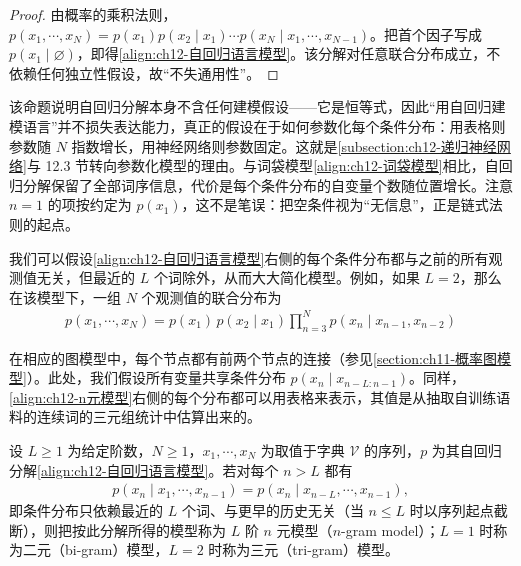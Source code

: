 \documentclass[../../main.tex]{subfiles}
\begin{document}
\begin{proof}
由概率的乘积法则，$p(x_1,\cdots,x_N)=p(x_1)p(x_2\mid x_1)\cdots p(x_N\mid x_1,\cdots,x_{N-1})$。把首个因子写成 $p(x_1\mid\varnothing)$，即得\eqref{align:ch12-自回归语言模型}。该分解对任意联合分布成立，不依赖任何独立性假设，故“不失通用性”。
\end{proof}

\begin{remark}
该命题说明自回归分解本身不含任何建模假设——它是恒等式，因此“用自回归建模语言”并不损失表达能力，真正的假设在于如何参数化每个条件分布：用表格则参数随 $N$ 指数增长，用神经网络则参数固定。这就是\cref{subsection:ch12-递归神经网络}与 12.3 节转向参数化模型的理由。与词袋模型\eqref{align:ch12-词袋模型}相比，自回归分解保留了全部词序信息，代价是每个条件分布的自变量个数随位置增长。注意 $n=1$ 的项按约定为 $p(x_1)$，这不是笔误：把空条件视为“无信息”，正是链式法则的起点。
\end{remark}

我们可以假设\eqref{align:ch12-自回归语言模型}右侧的每个条件分布都与之前的所有观测值无关，但最近的 $L$ 个词除外，从而大大简化模型。例如，如果 $L=2$，那么在该模型下，一组 $N$ 个观测值的联合分布为
\begin{align}
p(x_1,\cdots,x_N)=p(x_1)\,p(x_2\mid x_1)\prod_{n=3}^{N}p(x_n\mid x_{n-1},x_{n-2})
\label{align:ch12-n元模型}
\end{align}

在相应的图模型中，每个节点都有前两个节点的连接（参见\cref{section:ch11-概率图模型}）。此处，我们假设所有变量共享条件分布 $p(x_n\mid x_{n-L:n-1})$。同样，\eqref{align:ch12-n元模型}右侧的每个分布都可以用表格来表示，其值是从抽取自训练语料的连续词的三元组统计中估算出来的。

\begin{definition}[$n$ 元模型]\label{definition:ch12-n元模型}
设 $L\geqslant1$ 为给定阶数，$N\geqslant1$，$x_1,\cdots,x_N$ 为取值于字典 $\mathcal{V}$ 的序列，$p$ 为其自回归分解\eqref{align:ch12-自回归语言模型}。若对每个 $n>L$ 都有
\begin{align*}
p(x_n\mid x_1,\cdots,x_{n-1})=p(x_n\mid x_{n-L},\cdots,x_{n-1}),
\end{align*}
即条件分布只依赖最近的 $L$ 个词、与更早的历史无关（当 $n\leqslant L$ 时以序列起点截断），则把按此分解所得的模型称为 $L$ 阶 $n$ 元模型（$n$-gram model）；$L=1$ 时称为二元（bi-gram）模型，$L=2$ 时称为三元（tri-gram）模型。
\end{definition}
\end{document}
